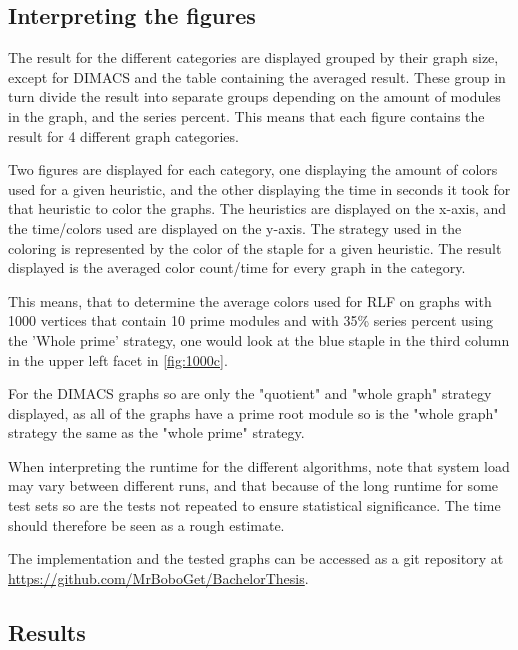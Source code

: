 \documentclass[a4paper]{article}
\begin{document}
\subsection{Interpreting the figures}

The result for the different categories are displayed grouped by their graph
size, except for DIMACS and the table containing the averaged result. These
group in turn divide the result into separate groups depending on the amount of
modules in the graph, and the series percent. This means that each figure
contains the result for 4 different graph categories.

Two figures are displayed for each category, one displaying the amount of
colors used for a given heuristic, and the other displaying the time in seconds
it took for that heuristic to color the graphs. The heuristics are displayed on
the x-axis, and the time/colors used are displayed on the y-axis. The strategy
used in the coloring is represented by the color of the staple for a given
heuristic. The result displayed is the averaged color count/time for every
graph in the category.

This means, that to determine the average colors used for RLF on graphs with
1000 vertices that contain 10 prime modules and with 35\% series percent using
the 'Whole prime' strategy, one would look at the blue staple in the third
column in the upper left facet in \autoref{fig:1000c}.

For the DIMACS graphs so are only the "quotient" and "whole graph" strategy displayed,
as all of the graphs have a prime root module so is the "whole graph" strategy
the same as the "whole prime" strategy.

When interpreting the runtime for the different algorithms, note
that system load may vary between different runs, and that because of
the long runtime for some test sets so are the tests not repeated to ensure
statistical significance. The time should therefore be seen as a rough
estimate.

The implementation and the tested graphs can be accessed as a git repository 
at \url{https://github.com/MrBoboGet/BachelorThesis}.

\subsection{Results}
\newpage


\newcommand{\figdesc}[0]{Graph coloring algorithm is on the x-axis, color/time is on the y-axis, staple colors represent the different strategies. }
\newcommand{\facfigdesc}[0]{\figdesc Result faceted by Module size and series percent. }
\end{document}
